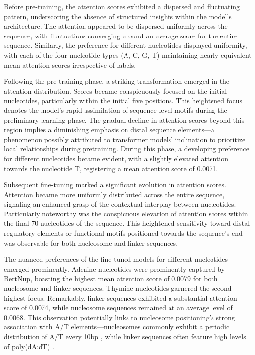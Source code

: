 \documentclass[a4paper,fleqn]{cas-dc}
\begin{document}
Before pre-training, the attention scores exhibited a dispersed and fluctuating pattern, underscoring the absence of structured insights within the model's architecture. The attention appeared to be dispersed uniformly across the sequence, with fluctuations converging around an average score for the entire sequence. Similarly, the preference for different nucleotides displayed uniformity, with each of the four nucleotide types (A, C, G, T) maintaining nearly equivalent mean attention scores irrespective of labels.

Following the pre-training phase, a striking transformation emerged in the attention distribution. Scores became conspicuously focused on the initial nucleotides, particularly within the initial five positions. This heightened focus denotes the model's rapid assimilation of sequence-level motifs during the preliminary learning phase. The gradual decline in attention scores beyond this region implies a diminishing emphasis on distal sequence elements—a phenomenon possibly attributed to transformer models' inclination to prioritize local relationships during pretraining. During this phase, a developing preference for different nucleotides became evident, with a slightly elevated attention towards the nucleotide T, registering a mean attention score of 0.0071.

Subsequent fine-tuning marked a significant evolution in attention scores. Attention became more uniformly distributed across the entire sequence, signaling an enhanced grasp of the contextual interplay between nucleotides. Particularly noteworthy was the conspicuous elevation of attention scores within the final 70 nucleotides of the sequence. This heightened sensitivity toward distal regulatory elements or functional motifs positioned towards the sequence's end was observable for both nucleosome and linker sequences.

The nuanced preferences of the fine-tuned models for different nucleotides emerged prominently. Adenine nucleotides were prominently captured by BertNup, boasting the highest mean attention score of 0.0079 for both nucleosome and linker sequences. Thymine nucleotides garnered the second-highest focus. Remarkably, linker sequences exhibited a substantial attention score of 0.0074, while nucleosome sequences remained at an average level of 0.0068. This observation potentially links to nucleosome positioning's strong association with A/T elements—nucleosomes commonly exhibit a periodic distribution of A/T every 10bp \cite{Field2008}, while linker sequences often feature high levels of poly(dA:dT) \cite{Segal_2_2009}.
\end{document}
